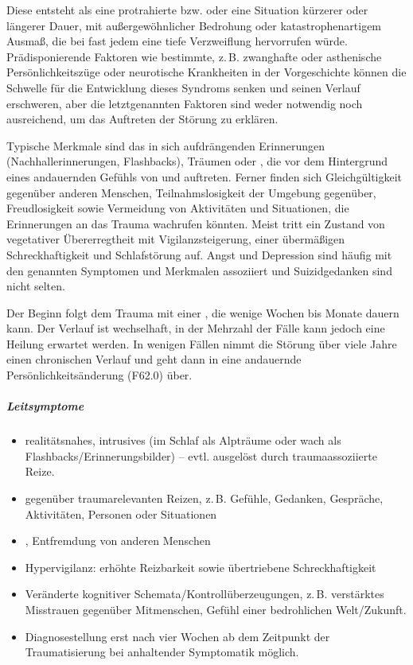 {

\label{topic:ptss}
Diese entsteht als eine protrahierte bzw.  oder eine Situation
kürzerer oder längerer Dauer, mit außergewöhnlicher
Bedrohung oder katastrophenartigem Ausmaß, die bei fast
jedem eine tiefe Verzweiflung hervorrufen würde.
Prädisponierende Faktoren wie bestimmte, z.\,B. zwanghafte
oder asthenische Persönlichkeitszüge oder neurotische
Krankheiten in der Vorgeschichte können die Schwelle für die
Entwicklung dieses Syndroms senken und seinen Verlauf
erschweren, aber die letztgenannten Faktoren sind weder
notwendig noch ausreichend, um das Auftreten der Störung zu
erklären. 

Typische Merkmale sind das  in sich aufdrängenden Erinnerungen
(Nachhallerinnerungen, Flashbacks), Träumen oder ,
die vor dem Hintergrund eines andauernden Gefühls von
 und  auftreten. Ferner
finden sich Gleichgültigkeit gegenüber anderen Menschen,
Teilnahmslosigkeit der Umgebung gegenüber, Freudlosigkeit
sowie Vermeidung von Aktivitäten und Situationen, die
Erinnerungen an das Trauma wachrufen könnten. Meist tritt
ein Zustand von vegetativer Übererregtheit mit
Vigilanzsteigerung, einer übermäßigen Schreckhaftigkeit und
Schlafstörung auf. Angst und Depression sind häufig mit den
genannten Symptomen und Merkmalen assoziiert und
Suizidgedanken sind nicht selten. 

Der Beginn folgt dem
Trauma mit einer , die wenige Wochen bis Monate dauern
kann. Der Verlauf ist wechselhaft, in der Mehrzahl der Fälle
kann jedoch eine Heilung erwartet werden. In wenigen Fällen
nimmt die Störung über viele Jahre einen chronischen Verlauf
und geht dann in eine andauernde Persönlichkeitsänderung
(F62.0) über.

\subparagraph{Leitsymptome}
\begin{itemize}
  \item realitätsnahes, intrusives  (im
  Schlaf als Alpträume oder wach als Flashbacks/Erinnerungsbilder)
  -- evtl. ausgelöst durch traumaassoziierte Reize.
  \item {} gegenüber traumarelevanten
  Reizen, z.\,B. Gefühle, Gedanken, Gespräche, Aktivitäten,
  Personen oder Situationen
  \item {}, Entfremdung von anderen
  Menschen
  \item Hypervigilanz: erhöhte Reizbarkeit sowie
  übertriebene Schreckhaftigkeit
  \item Veränderte kognitiver
  Schemata/Kontrollüberzeugungen, z.\,B. verstärktes
  Misstrauen gegenüber Mitmenschen, Gefühl einer
  bedrohlichen Welt/Zukunft.
  \item Diagnosestellung erst nach vier Wochen ab dem
  Zeitpunkt der Traumatisierung bei anhaltender Symptomatik
  möglich.
\end{itemize}

}
